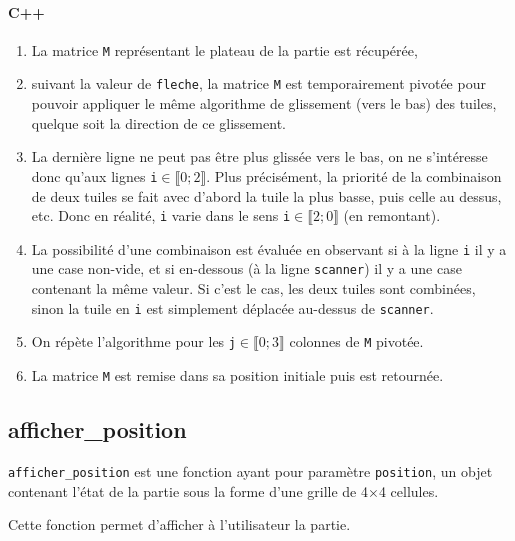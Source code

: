 \documentclass[a4paper]{report}
\begin{document}
\paragraph{C++}

\begin{enumerate}
\item La matrice \verb|M| représentant le plateau de la partie est récupérée,
\item suivant la valeur de \verb|fleche|, la matrice \verb|M| est temporairement pivotée pour pouvoir appliquer le même algorithme de glissement (vers le bas) des tuiles, quelque soit la direction de ce glissement.
\item La dernière ligne ne peut pas être plus glissée vers le bas, on ne s'intéresse donc qu'aux lignes \verb|i|$\in\llbracket0;2\rrbracket$. Plus précisément, la priorité de la combinaison de deux tuiles se fait avec d'abord la tuile la plus basse, puis celle au dessus, etc. Donc en réalité, \verb|i| varie dans le sens \verb|i|$\in\llbracket2;0\rrbracket$ (en remontant).
\item La possibilité d'une combinaison est évaluée en observant si à la ligne \verb|i| il y a une case non-vide, et si en-dessous (à la ligne \verb|scanner|) il y a une case contenant la même valeur. Si c'est le cas, les deux tuiles sont combinées, sinon la tuile en \verb|i| est simplement déplacée au-dessus de \verb|scanner|.
\item On répète l'algorithme pour les \verb|j|$\in\llbracket0;3\rrbracket$ colonnes de \verb|M| pivotée.
\item La matrice \verb|M| est remise dans sa position initiale puis est retournée.
\end{enumerate}



\subsection{afficher\_position}
\verb|afficher_position| est une fonction ayant pour paramètre \verb|position|, un objet contenant l'état de la partie sous la forme d'une grille de 4$\times$4 cellules.

Cette fonction permet d'afficher à l'utilisateur la partie.
\end{document}
